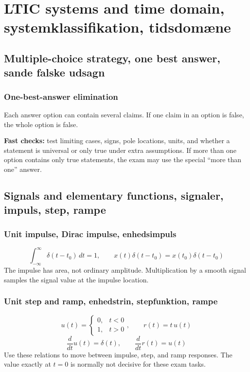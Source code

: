 \section{LTIC systems and time domain, systemklassifikation, tidsdomæne}

\subsection{Multiple-choice strategy, one best answer, sande falske udsagn}

\subsubsection{One-best-answer elimination}
Each answer option can contain several claims. If one claim in an option is false, the whole option is false.

\textbf{Fast checks:} test limiting cases, signs, pole locations, units, and whether a statement is universal or only true under extra assumptions. If more than one option contains only true statements, the exam may use the special ``more than one'' answer.

\subsection{Signals and elementary functions, signaler, impuls, step, rampe}

\subsubsection{Unit impulse, Dirac impulse, enhedsimpuls}
\[
\int_{-\infty}^{\infty}\delta(t-t_0)\,dt=1,\qquad
x(t)\delta(t-t_0)=x(t_0)\delta(t-t_0)
\]
The impulse has area, not ordinary amplitude. Multiplication by a smooth signal samples the signal value at the impulse location.

\subsubsection{Unit step and ramp, enhedstrin, stepfunktion, rampe}
\[
u(t)=\begin{cases}0,&t<0\\1,&t>0\end{cases},\qquad r(t)=t\,u(t)
\]
\[
\frac{d}{dt}u(t)=\delta(t),\qquad \frac{d}{dt}r(t)=u(t)
\]
Use these relations to move between impulse, step, and ramp responses. The value exactly at \(t=0\) is normally not decisive for these exam tasks.

